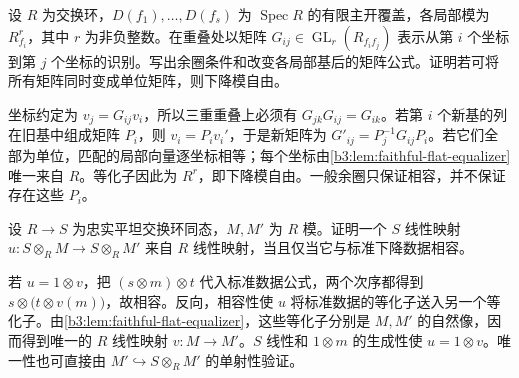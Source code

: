 \begin{optionalexercise}\label{b3:ex:12-cocycle-change-bases}
	设 \(R\) 为交换环，\(D(f_1),\ldots,D(f_s)\) 为 \(\operatorname{Spec}R\) 的有限主开覆盖，各局部模为 \(R_{f_i}^r\)，其中 \(r\) 为非负整数。在重叠处以矩阵 \(G_{ij}\in\operatorname{GL}_r(R_{f_if_j})\) 表示从第 \(i\) 个坐标到第 \(j\) 个坐标的识别。写出余圈条件和改变各局部基后的矩阵公式。证明若可将所有矩阵同时变成单位矩阵，则下降模自由。
\end{optionalexercise}
\begin{solution}
	坐标约定为 \(v_j=G_{ij}v_i\)，所以三重重叠上必须有 \(G_{jk}G_{ij}=G_{ik}\)。若第 \(i\) 个新基的列在旧基中组成矩阵 \(P_i\)，则 \(v_i=P_iv_i'\)，于是新矩阵为 \(G'_{ij}=P_j^{-1}G_{ij}P_i\)。若它们全部为单位，匹配的局部向量逐坐标相等；每个坐标由\cref{b3:lem:faithful-flat-equalizer}唯一来自 \(R\)。等化子因此为 \(R^r\)，即下降模自由。一般余圈只保证相容，并不保证存在这些 \(P_i\)。
\end{solution}

\begin{optionalexercise}\label{b3:ex:12-descent-morphisms}
	设 \(R\to S\) 为忠实平坦交换环同态，\(M,M'\) 为 \(R\) 模。证明一个 \(S\) 线性映射 \(u:S\otimes_RM\to S\otimes_RM'\) 来自 \(R\) 线性映射，当且仅当它与标准下降数据相容。
\end{optionalexercise}
\begin{solution}
	若 \(u=1\otimes v\)，把 \((s\otimes m)\otimes t\) 代入标准数据公式，两个次序都得到 \(s\otimes\bigl(t\otimes v(m)\bigr)\)，故相容。反向，相容性使 \(u\) 将标准数据的等化子送入另一个等化子。由\cref{b3:lem:faithful-flat-equalizer}，这些等化子分别是 \(M,M'\) 的自然像，因而得到唯一的 \(R\) 线性映射 \(v:M\to M'\)。\(S\) 线性和 \(1\otimes m\) 的生成性使 \(u=1\otimes v\)。唯一性也可直接由 \(M'\hookrightarrow S\otimes_RM'\) 的单射性验证。
\end{solution}
